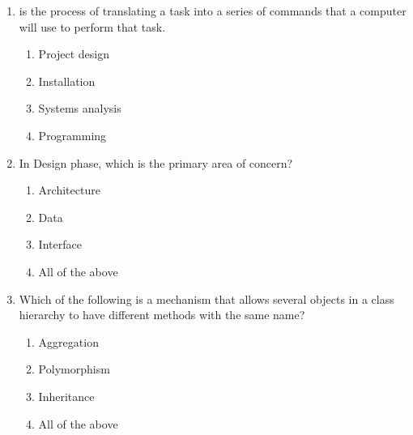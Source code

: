 \documentclass[12pt]{article}
\newcommand{\perhapsanswer}{%
  \ifanswer
    $\blacksquare$ \global\answerfalse
  \else
    $\square$ \global\answerfalse
  \fi
}
\newif\ifanswer
\begin{document}
\begin{enumerate}
    \item \underline{\phantom{Neither of the above}} is the process of translating a task into a series of commands that a computer will use to perform that task.
    \begin{enumerate}[start=1,align=left,label={\protect\perhapsanswer(\alph*)}]
      \item Project design
      \item Installation
      \item Systems analysis
      \item Programming
    \end{enumerate}

    \item In Design phase, which is the primary area of concern?
    \begin{enumerate}[start=1,align=left,label={\protect\perhapsanswer(\alph*)}]
      \item Architecture
      \item Data
      \item Interface
      \item All of the above
    \end{enumerate}

    \item Which of the following is a mechanism that allows several objects in a class hierarchy to have different methods with the same name?
    \begin{enumerate}[start=1,align=left,label={\protect\perhapsanswer(\alph*)}]
      \item Aggregation
      \item Polymorphism
      \item Inheritance
      \item All of the above
    \end{enumerate}

  \end{enumerate}
\end{document}
